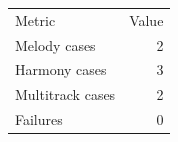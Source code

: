 \begin{tabular}{lr}
Metric & Value \\
Melody cases & 2 \\
Harmony cases & 3 \\
Multitrack cases & 2 \\
Failures & 0 \\
\end{tabular}
